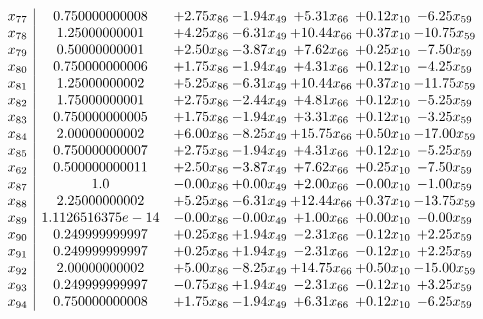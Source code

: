\documentclass[8pt]{article}
\begin{document}
\[\begin{array}{c| c c@{\hskip 2pt} c@{\hskip 2pt} c@{\hskip 2pt} c@{\hskip 2pt} c@{\hskip 2pt} }
 x_{77}   &  0.750000000008 & +  2.75 x_{86} & -1.94 x_{49} & +  5.31 x_{66} & +  0.12 x_{10} & -6.25 x_{59}\\
 x_{78}   &  1.25000000001 & +  4.25 x_{86} & -6.31 x_{49} & + 10.44 x_{66} & +  0.37 x_{10} & -10.75 x_{59}\\
 x_{79}   &  0.50000000001 & +  2.50 x_{86} & -3.87 x_{49} & +  7.62 x_{66} & +  0.25 x_{10} & -7.50 x_{59}\\
 x_{80}   &  0.750000000006 & +  1.75 x_{86} & -1.94 x_{49} & +  4.31 x_{66} & +  0.12 x_{10} & -4.25 x_{59}\\
 x_{81}   &  1.25000000002 & +  5.25 x_{86} & -6.31 x_{49} & + 10.44 x_{66} & +  0.37 x_{10} & -11.75 x_{59}\\
 x_{82}   &  1.75000000001 & +  2.75 x_{86} & -2.44 x_{49} & +  4.81 x_{66} & +  0.12 x_{10} & -5.25 x_{59}\\
 x_{83}   &  0.750000000005 & +  1.75 x_{86} & -1.94 x_{49} & +  3.31 x_{66} & +  0.12 x_{10} & -3.25 x_{59}\\
 x_{84}   &  2.00000000002 & +  6.00 x_{86} & -8.25 x_{49} & + 15.75 x_{66} & +  0.50 x_{10} & -17.00 x_{59}\\
 x_{85}   &  0.750000000007 & +  2.75 x_{86} & -1.94 x_{49} & +  4.31 x_{66} & +  0.12 x_{10} & -5.25 x_{59}\\
 x_{62}   &  0.500000000011 & +  2.50 x_{86} & -3.87 x_{49} & +  7.62 x_{66} & +  0.25 x_{10} & -7.50 x_{59}\\
 x_{87}   &  1.0 & -0.00 x_{86} & +  0.00 x_{49} & +  2.00 x_{66} & -0.00 x_{10} & -1.00 x_{59}\\
 x_{88}   &  2.25000000002 & +  5.25 x_{86} & -6.31 x_{49} & + 12.44 x_{66} & +  0.37 x_{10} & -13.75 x_{59}\\
 x_{89}   &  1.1126516375e-14 & -0.00 x_{86} & -0.00 x_{49} & +  1.00 x_{66} & +  0.00 x_{10} & -0.00 x_{59}\\
 x_{90}   &  0.249999999997 & +  0.25 x_{86} & +  1.94 x_{49} & -2.31 x_{66} & -0.12 x_{10} & +  2.25 x_{59}\\
 x_{91}   &  0.249999999997 & +  0.25 x_{86} & +  1.94 x_{49} & -2.31 x_{66} & -0.12 x_{10} & +  2.25 x_{59}\\
 x_{92}   &  2.00000000002 & +  5.00 x_{86} & -8.25 x_{49} & + 14.75 x_{66} & +  0.50 x_{10} & -15.00 x_{59}\\
 x_{93}   &  0.249999999997 & -0.75 x_{86} & +  1.94 x_{49} & -2.31 x_{66} & -0.12 x_{10} & +  3.25 x_{59}\\
 x_{94}   &  0.750000000008 & +  1.75 x_{86} & -1.94 x_{49} & +  6.31 x_{66} & +  0.12 x_{10} & -6.25 x_{59}\\

\end{array}\]
\end{document}
